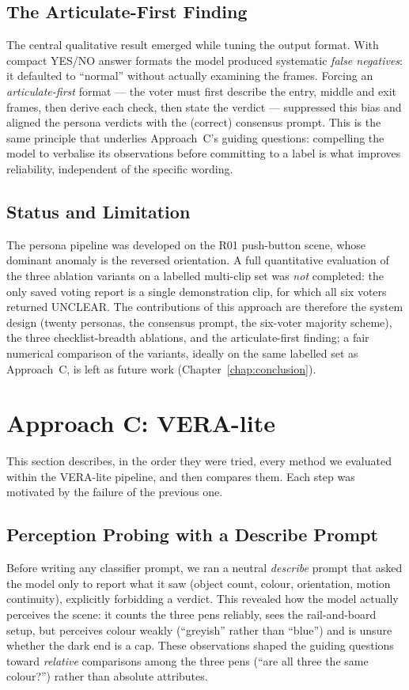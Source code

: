 \subsection{The Articulate-First Finding}
The central qualitative result emerged while tuning the output format. With compact
YES/NO answer formats the model produced systematic \emph{false negatives}: it defaulted
to ``normal'' without actually examining the frames. Forcing an \emph{articulate-first}
format --- the voter must first describe the entry, middle and exit frames, then derive
each check, then state the verdict --- suppressed this bias and aligned the persona
verdicts with the (correct) consensus prompt. This is the same principle that underlies
Approach~C's guiding questions: compelling the model to verbalise its observations before
committing to a label is what improves reliability, independent of the specific wording.

\subsection{Status and Limitation}
The persona pipeline was developed on the R01 push-button scene, whose dominant anomaly is
the reversed orientation. A full quantitative evaluation of the three ablation variants on
a labelled multi-clip set was \emph{not} completed: the only saved voting report is a
single demonstration clip, for which all six voters returned UNCLEAR. The contributions of
this approach are therefore the system design (twenty personas, the consensus prompt, the
six-voter majority scheme), the three checklist-breadth ablations, and the articulate-first
finding; a fair numerical comparison of the variants, ideally on the same labelled set as
Approach~C, is left as future work (Chapter~\ref{chap:conclusion}).

\section{Approach C: VERA-lite}
This section describes, in the order they were tried, every method we evaluated within
the VERA-lite pipeline, and then compares them. Each step was motivated by the failure of
the previous one.

\subsection{Perception Probing with a Describe Prompt}
Before writing any classifier prompt, we ran a neutral \emph{describe} prompt that asked
the model only to report what it saw (object count, colour, orientation, motion
continuity), explicitly forbidding a verdict. This revealed how the model actually
perceives the scene: it counts the three pens reliably, sees the rail-and-board setup,
but perceives colour weakly (``greyish'' rather than ``blue'') and is unsure whether the
dark end is a cap. These observations shaped the guiding questions toward
\emph{relative} comparisons among the three pens (``are all three the same colour?'')
rather than absolute attributes.

